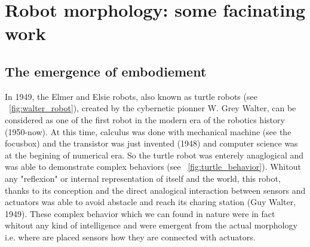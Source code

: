 
% 
\chapter{Robot morphology: some facinating work} %



\section{The emergence of embodiement} %

In 1949, the Elmer and Elsie robots, also known as turtle robots (see \figurename~\ref{fig:walter_robot}), created by the cybernetic pionner W. Grey Walter, can be considered as one of the first robot in the modern era of the robotics history (1950-now). At this time, calculus was done with mechanical machine (see the focusbox) and the transistor was just invented (1948) and computer science was at the begining of numerical era. So the turtle robot was enterely anaglogical and was able to demonstrate complex behaviors (see \figurename~\ref{fig:turtle_behavior}). Whitout any "reflexion" or internal representation of itself and the world, this robot, thanks to its conception and the direct analogical interaction between sensors and actuators was able to avoid abstacle and reach its charing station (Guy Walter, 1949). These complex behavior which we can found in nature were in fact whitout any kind of intelligence and were emergent from the actual morphology i.e. where are placed sensors how they are connected with actuators.

\begin{figure}[]
\centering
    \hfil
    \caption{}
    \label{fig:turtle_robot}
\end{figure}

